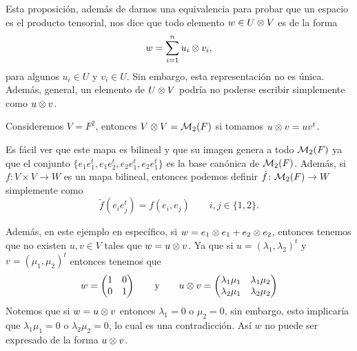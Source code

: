 Esta proposición, además de darnos una equivalencia para probar que un espacio es el producto tensorial, nos dice que todo elemento $w \in U \otimes V$ es de la forma
\[
  w = \sum_{i=1}^n u_i \otimes v_i,
\]
para algunos $u_i \in U$ y $v_i \in U$. Sin embargo, esta representación no es única. Además, general, un elemento de $U \otimes V$ podría no poderse escribir simplemente como $u \otimes v$.

\begin{example}
  Consideremos $V = F^2$, entonces $V \otimes V = \mathcal{M}_2(F)$ si tomamos $u \otimes v = uv^t$. 

  Es fácil ver que este mapa es bilineal y que su imagen genera a todo $\mathcal{M}_2(F)$ ya que el conjunto $\{e_1 e_1^t, e_1 e_2^t, e_2 e_1^t, e_2 e_1^t\}$ es la base canónica de $\mathcal{M}_2(F)$. Además, si $f\colon V \times V \to W$ es un mapa bilineal, entonces podemos definir $\tilde f \colon \mathcal{M}_2(F) \to W$ simplemente como
  \[
    \tilde f ( e_i e_j^t) = f(e_i, e_j)   \qquad i,j \in \{ 1,2\}.
  \]
  

  Además, en este ejemplo en específico, si $w = e_1 \otimes e_1 + e_2 \otimes e_2$, entonces tenemos que no existen $u,v \in V$ tales que $w = u \otimes v $. Ya que si $u = (\lambda_1, \lambda_2)^t$ y $v = (\mu_1, \mu_2)^t$ entonces tenemos que
  \[
    w = \begin{pmatrix}1 & 0 \\ 0 & 1\end{pmatrix} 
    \qquad\text{y}\qquad
    u \otimes v = 
      \begin{pmatrix}
        \lambda_1 \mu_1 & \lambda_1 \mu_2 \\
        \lambda_2 \mu_1 & \lambda_2 \mu_2
      \end{pmatrix}
  \]
  Notemos que si $w = u \otimes v$ entonces $\lambda_1 = 0$ o $\mu_2 = 0$, sin embargo, esto implicaría que $\lambda_1\mu_1 = 0$ o $\lambda_2\mu_2 = 0$, lo cual es una contradicción. Así $w$ no puede ser expresado de la forma $u \otimes v$.
\end{example}